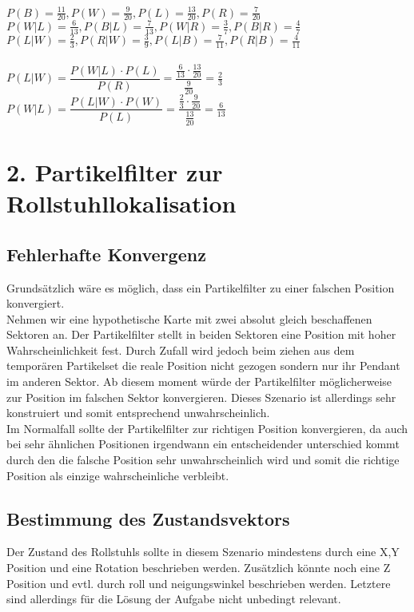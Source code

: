 \documentclass{../Vorlage/mat}
\begin{document}
$P(B) = \frac{11}{20}, P(W) = \frac{9}{20}, P(L) = \frac{13}{20}, P(R) = \frac{7}{20}$\\
$P(W|L) = \frac{6}{13}, P(B|L) = \frac{7}{13}, P(W|R) = \frac{3}{7}, P(B|R) = \frac{4}{7}$\\
$P(L|W) = \frac{2}{3}, P(R|W) = \frac{3}{9}, P(L|B) = \frac{7}{11}, P(R|B) = \frac{4}{11}$\\
\\
$P(L|W) = \dfrac{P(W|L) \cdot P(L)}{P(R)} = \dfrac{\frac{6}{13} \cdot \frac{13}{20}}{\frac{9}{20}} = \frac{2}{3}$\\
$P(W|L) = \dfrac{P(L|W) \cdot P(W)}{P(L)} = \dfrac{\frac{2}{3} \cdot \frac{9}{20}}{\frac{13}{20}} = \frac{6}{13}$


\section*{2. Partikelfilter zur Rollstuhllokalisation}
\subsection*{Fehlerhafte Konvergenz}
Grundsätzlich wäre es möglich, dass ein Partikelfilter zu einer falschen Position konvergiert.\\
Nehmen wir eine hypothetische Karte mit zwei absolut gleich beschaffenen Sektoren an. Der Partikelfilter stellt in beiden Sektoren eine Position mit hoher Wahrscheinlichkeit fest. Durch Zufall wird jedoch beim ziehen aus dem temporären Partikelset die reale Position nicht gezogen sondern nur ihr Pendant im anderen Sektor. Ab diesem moment würde der Partikelfilter möglicherweise zur Position im falschen Sektor konvergieren. Dieses Szenario ist allerdings sehr konstruiert und somit entsprechend unwahrscheinlich.\\
Im Normalfall sollte der Partikelfilter zur richtigen Position konvergieren, da auch bei sehr ähnlichen Positionen irgendwann ein entscheidender unterschied kommt durch den die falsche Position sehr unwahrscheinlich wird und somit die richtige Position als einzige wahrscheinliche verbleibt.
\subsection*{Bestimmung des Zustandsvektors}
Der Zustand des Rollstuhls sollte in diesem Szenario mindestens durch eine X,Y Position und eine Rotation beschrieben werden. Zusätzlich könnte noch eine Z Position und evtl. durch roll und neigungswinkel beschrieben werden. Letztere sind allerdings für die Lösung der Aufgabe nicht unbedingt relevant.
\end{document}
